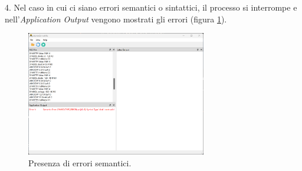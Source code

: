 4. Nel caso in cui ci siano errori semantici o sintattici, il processo si interrompe e nell'\textit{Application Output} vengono mostrati gli errori (figura \ref{fig:punto_4}).

\begin{figure}[h!]
	\centering
	\includegraphics[width=0.7\textwidth]{./ImageFiles/semantic error.png}
	\caption{Presenza di errori semantici.}
	\label{fig:punto_4}
\end{figure}






